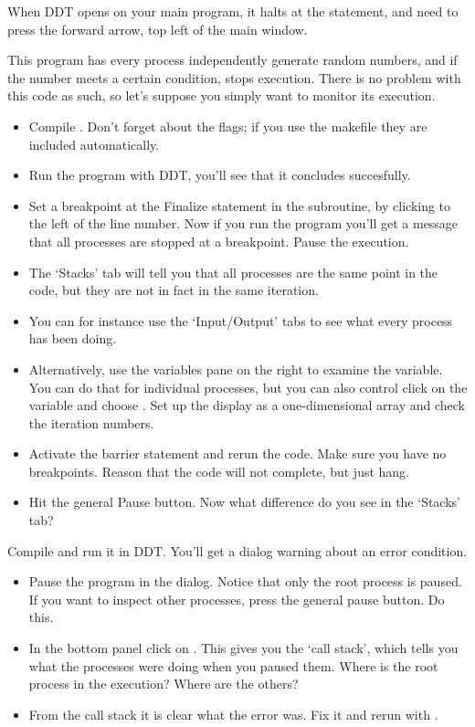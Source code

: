 When DDT opens on your main program, it halts at the 
statement, and need to press the forward arrow, top left of the main
window.

 This program has every process independently generate
random numbers, and if the number meets a certain condition, stops execution.
There is no problem with this code as such, so let's suppose you simply want
to monitor its execution.
\begin{itemize}
\item Compile . Don't forget about the  flags;
  if you use the makefile they are included automatically.
\item Run the program with DDT, you'll see that it concludes
  succesfully.
\item Set a breakpoint at the Finalize statement in the subroutine, by
  clicking to the left of the line number. Now if you run the program
  you'll get a message that all processes are stopped at a
  breakpoint. Pause the execution.
\item The `Stacks' tab will tell you that all processes are the same
  point in the code, but they are not in fact in the same
  iteration. 
\item You can for instance use the `Input/Output' tabs to see what every process has been doing.
\item Alternatively, use the variables pane on the right to examine
  the  variable. You can do that for individual processes, but
  you can also control click on the  variable and choose . Set up the display as a one-dimensional array and check
  the iteration numbers.
\item Activate the barrier statement and rerun the code. Make sure you
  have no breakpoints. Reason that the code will not complete, but
  just hang.
\item Hit the general Pause button. Now what difference do you see in the `Stacks' tab?
\end{itemize}

 Compile  and run it in DDT. You'll
get a dialog warning about an error condition.
\begin{itemize}
\item Pause the program in the dialog. Notice that only the root process is
  paused. If you want to inspect other processes, press the general
  pause button. Do this.
\item In the bottom panel click on . This gives you the
  `call stack', which tells you what the processes were doing when you
  paused them. Where is the root process in the execution? Where are
  the others?
\item From the call stack it is clear what the error was. Fix it and
  rerun with .
\end{itemize}

